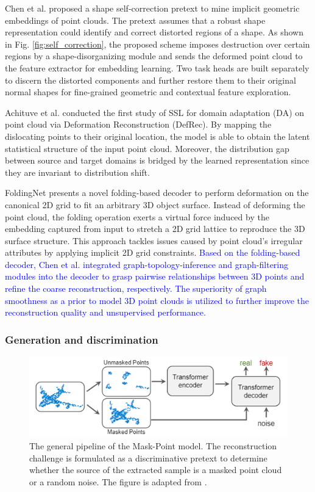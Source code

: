\documentclass[a4paper,fleqn]{cas-dc}
\begin{document}
Chen et al. \citep{chen2021shape} proposed a shape self-correction pretext to mine implicit geometric embeddings of point clouds. The pretext assumes that a robust shape representation could identify and correct distorted regions of a shape. As shown in Fig. \ref{fig:self_correction}, the proposed scheme imposes destruction over certain regions by a shape-disorganizing module and sends the deformed point cloud to the feature extractor for embedding learning. Two task heads are built separately to discern the distorted components and further restore them to their original normal shapes for fine-grained geometric and contextual feature exploration.

Achituve et al. \citep{achituve2021self} conducted the first study of SSL for domain adaptation (DA) on point cloud via Deformation Reconstruction (DefRec). By mapping the dislocating points to their original location, the model is able to obtain the latent statistical structure of the input point cloud. Moreover, the distribution gap between source and target domains is bridged by the learned representation since they are invariant to distribution shift.

FoldingNet \citep{yang2018foldingnet} presents a novel folding-based decoder to perform deformation on the canonical 2D grid to fit an arbitrary 3D object surface. Instead of deforming the point cloud, the folding operation exerts a virtual force induced by the embedding captured from input to stretch a 2D grid lattice to reproduce the 3D surface structure. This approach tackles issues caused by point cloud's irregular attributes by applying implicit 2D grid constraints. \textcolor{blue}{Based on the folding-based decoder, Chen et al. \citep{chen2019deep} integrated graph-topology-inference and graph-filtering modules into the decoder to grasp pairwise relationships between 3D points and refine the coarse reconstruction, respectively. The superiority of graph smoothness as a prior to model 3D point clouds is utilized to further improve the reconstruction quality and unsupervised performance.}

\subsubsection{Generation and discrimination}
\begin{figure}[htbp]
    \centering
    \includegraphics[width=0.97\linewidth]{maskpoint.png}
    \caption{The general pipeline of the Mask-Point model. The reconstruction challenge is formulated as a discriminative pretext to determine whether the source of the extracted sample is a masked point cloud or a random noise. The figure is adapted from \citep{liu2022masked}.}
    \label{fig:maskpoint}
\end{figure}
\end{document}
